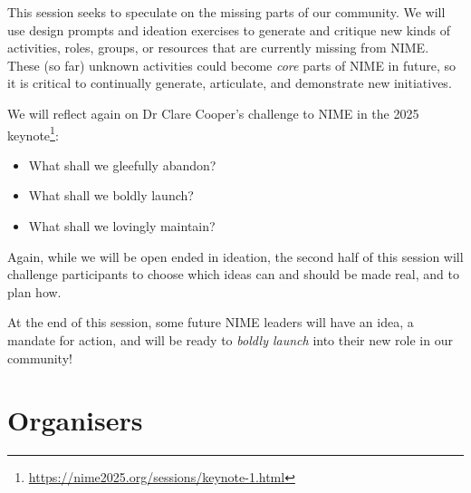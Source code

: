 \documentclass[acmsmall]{nimeart}
\begin{document}
This session seeks to speculate on the missing parts of our community. 
We will use design prompts and ideation exercises to generate and critique new kinds of activities, roles, groups, or resources that are currently missing from NIME.
These (so far) unknown activities could become \emph{core} parts of NIME in future, so it is critical to continually generate, articulate, and demonstrate new initiatives.

We will reflect again on Dr Clare Cooper's challenge to NIME in the 2025 keynote\footnote{\url{https://nime2025.org/sessions/keynote-1.html}}:
\begin{itemize}
    \item What shall we gleefully abandon?
    \item What shall we boldly launch?
    \item What shall we lovingly maintain?
\end{itemize}
Again, while we will be open ended in ideation, the second half of this session will challenge participants to choose which ideas can and should be made real, and to plan how. 

At the end of this session, some future NIME leaders will have an idea, a mandate for action, and will be ready to \emph{boldly launch} into their new role in our community!

\section{Organisers}

\end{document}
